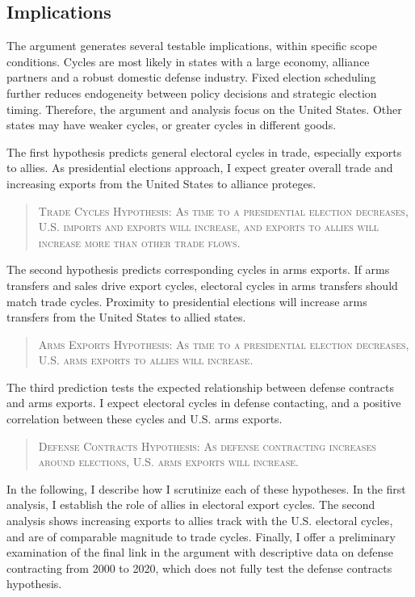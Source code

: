 \documentclass[12pt]{article}
\begin{document}
\subsection{Implications}



The argument generates several testable implications, within specific scope conditions. 
Cycles are most likely in states with a large economy, alliance partners and a robust domestic defense industry. 
Fixed election scheduling further reduces endogeneity between policy decisions and strategic election timing.
Therefore, the argument and analysis focus on the United States. 
Other states may have weaker cycles, or greater cycles in different goods.


The first hypothesis predicts general electoral cycles in trade, especially exports to allies. 
As presidential elections approach, I expect greater overall trade and increasing exports from the United States to alliance proteges.


\begin{quote}
\textsc{Trade Cycles Hypothesis: As time to a presidential election decreases, U.S. imports and exports will increase, and exports to allies will increase more than other trade flows.}
\end{quote}



The second hypothesis predicts corresponding cycles in arms exports.
If arms transfers and sales drive export cycles, electoral cycles in arms transfers should match trade cycles.
Proximity to presidential elections will increase arms transfers from the United States to allied states. 


\begin{quote}
\textsc{Arms Exports Hypothesis: As time to a presidential election decreases, U.S. arms exports to allies will increase.}
\end{quote}


The third prediction tests the expected relationship between defense contracts and arms exports. 
I expect electoral cycles in defense contacting, and a positive correlation between these cycles and U.S. arms exports.


\begin{quote}
\textsc{Defense Contracts Hypothesis: As defense contracting increases around elections, U.S. arms exports will increase.}
\end{quote}



In the following, I describe how I scrutinize each of these hypotheses. 
In the first analysis, I establish the role of allies in electoral export cycles. 
The second analysis shows increasing exports to allies track with the U.S. electoral cycles, and are of comparable magnitude to trade cycles.
Finally, I offer a preliminary examination of the final link in the argument with descriptive data on defense contracting from 2000 to 2020, which does not fully test the defense contracts hypothesis.
\end{document}
